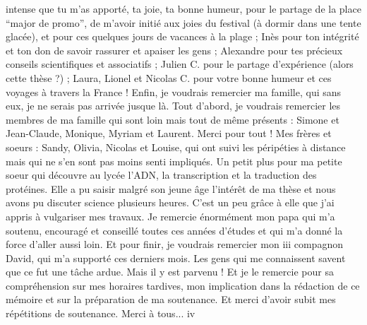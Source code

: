 intense que tu m’as apporté, ta joie, ta bonne humeur, pour le partage de la place “major
de promo”, de m’avoir initié aux joies du festival (à dormir dans une tente glacée), et
pour ces quelques jours de vacances à la plage ; Inès pour ton intégrité et ton don de
savoir rassurer et apaiser les gens ; Alexandre pour tes précieux conseils scientifiques et
associatifs ; Julien C. pour le partage d’expérience (alors cette thèse ?) ; Laura, Lionel et
Nicolas C. pour votre bonne humeur et ces voyages à travers la France !
Enfin, je voudrais remercier ma famille, qui sans eux, je ne serais pas arrivée jusque
là. Tout d’abord, je voudrais remercier les membres de ma famille qui sont loin mais tout
de même présents : Simone et Jean-Claude, Monique, Myriam et Laurent. Merci pour
tout ! Mes frères et soeurs : Sandy, Olivia, Nicolas et Louise, qui ont suivi les péripéties
à distance mais qui ne s’en sont pas moins senti impliqués. Un petit plus pour ma petite
soeur qui découvre au lycée l’ADN, la transcription et la traduction des protéines. Elle
a pu saisir malgré son jeune âge l’intérêt de ma thèse et nous avons pu discuter science
plusieurs heures. C’est un peu grâce à elle que j’ai appris à vulgariser mes travaux. Je
remercie énormément mon papa qui m’a soutenu, encouragé et conseillé toutes ces années
d’études et qui m’a donné la force d’aller aussi loin. Et pour finir, je voudrais remercier mon
iii
compagnon David, qui m’a supporté ces derniers mois. Les gens qui me connaissent savent
que ce fut une tâche ardue. Mais il y est parvenu ! Et je le remercie pour sa compréhension
sur mes horaires tardives, mon implication dans la rédaction de ce mémoire et sur la
préparation de ma soutenance. Et merci d’avoir subit mes répétitions de soutenance.
Merci à tous...
iv
